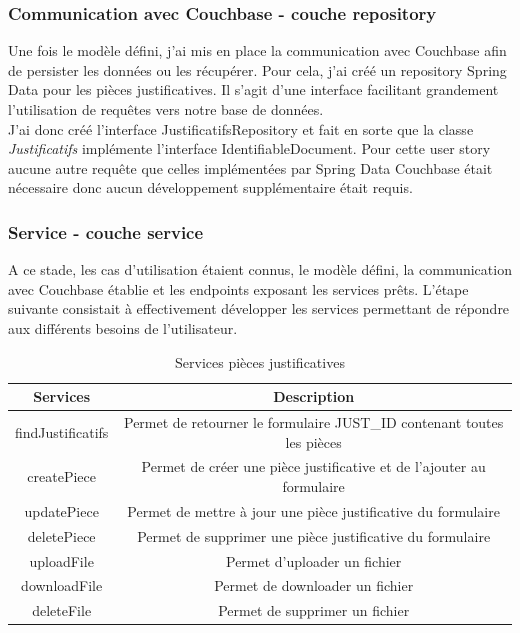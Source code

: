 	
	\subsubsection{Communication avec Couchbase - couche repository}
	
	Une fois le modèle défini, j'ai mis en place la communication avec Couchbase afin de persister les données ou les récupérer. Pour cela, j'ai créé un repository Spring Data pour les pièces justificatives. Il s'agit d'une interface facilitant grandement l'utilisation de requêtes vers notre base de données. \\
	
	J'ai donc créé l'interface JustificatifsRepository et fait en sorte que la classe \textit{Justificatifs} implémente l'interface IdentifiableDocument. Pour cette user story aucune autre requête que celles implémentées par Spring Data Couchbase était nécessaire donc aucun développement supplémentaire était requis. \\
		
	\subsubsection{Service - couche service}
	
	A ce stade, les cas d'utilisation étaient connus, le modèle défini, la communication avec Couchbase établie et les endpoints exposant les services prêts. L'étape suivante consistait à effectivement développer les services permettant de répondre aux différents besoins de l'utilisateur.
	
\begin{table}[h!]
	\center
	\begin{tabular}{| c | c |}
     \hline
     Services & Description \\ \hline
     findJustificatifs & Permet de retourner le formulaire JUST\_ID contenant toutes les pièces \\ \hline
     createPiece & Permet de créer une pièce justificative et de l'ajouter au formulaire \\ \hline
     updatePiece & Permet de mettre à jour une pièce justificative du formulaire \\ \hline
     deletePiece & Permet de supprimer une pièce justificative du formulaire \\ \hline
     uploadFile & Permet d'uploader un fichier \\ \hline
     downloadFile & Permet de downloader un fichier \\ \hline
     deleteFile & Permet de supprimer un fichier\\ \hline
	\end{tabular}
	\caption{Services pièces justificatives}
	\label{servicesPJ}
\end{table}

